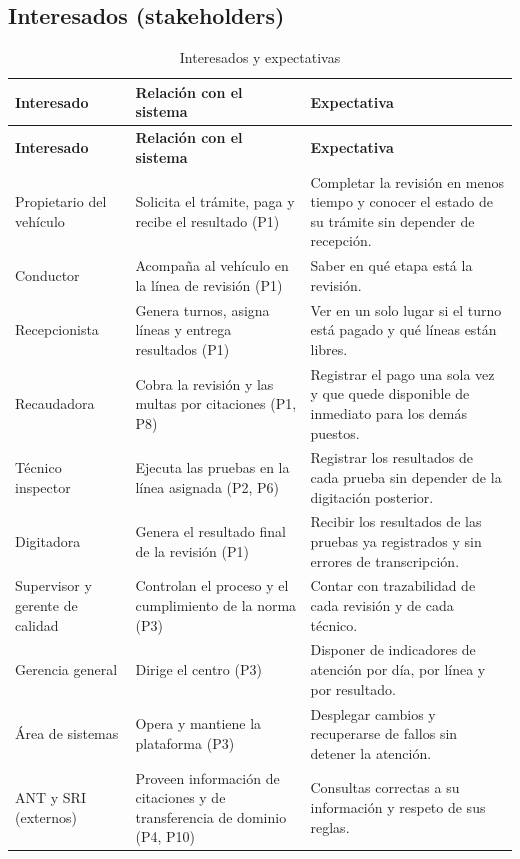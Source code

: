\documentclass[11pt,a4paper]{article}
\begin{document}
	\subsection{Interesados (stakeholders)}
	\begin{xltabular}{\textwidth}{L{3.3cm}L{4.5cm}X}
		\caption{Interesados y expectativas}\label{tab:stakeholders}\\
		\toprule
		\textbf{Interesado} & \textbf{Relación con el sistema} & \textbf{Expectativa} \\
		\midrule
		\endfirsthead
		\toprule
		\textbf{Interesado} & \textbf{Relación con el sistema} & \textbf{Expectativa} \\
		\midrule
		\endhead
		\bottomrule
		\endfoot
		Propietario del vehículo & Solicita el trámite, paga y recibe el resultado (P1) & Completar la revisión en menos tiempo y conocer el estado de su trámite sin depender de recepción. \\
		Conductor & Acompaña al vehículo en la línea de revisión (P1) & Saber en qué etapa está la revisión. \\
		Recepcionista & Genera turnos, asigna líneas y entrega resultados (P1) & Ver en un solo lugar si el turno está pagado y qué líneas están libres. \\
		Recaudadora & Cobra la revisión y las multas por citaciones (P1, P8) & Registrar el pago una sola vez y que quede disponible de inmediato para los demás puestos. \\
		Técnico inspector & Ejecuta las pruebas en la línea asignada (P2, P6) & Registrar los resultados de cada prueba sin depender de la digitación posterior. \\
		Digitadora & Genera el resultado final de la revisión (P1) & Recibir los resultados de las pruebas ya registrados y sin errores de transcripción. \\
		Supervisor y gerente de calidad & Controlan el proceso y el cumplimiento de la norma (P3) & Contar con trazabilidad de cada revisión y de cada técnico. \\
		Gerencia general & Dirige el centro (P3) & Disponer de indicadores de atención por día, por línea y por resultado. \\
		Área de sistemas & Opera y mantiene la plataforma (P3) & Desplegar cambios y recuperarse de fallos sin detener la atención. \\
		ANT y SRI (externos) & Proveen información de citaciones y de transferencia de dominio (P4, P10) & Consultas correctas a su información y respeto de sus reglas. \\
	\end{xltabular}
	
\end{document}

